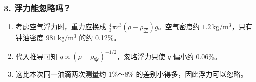 \subsubsection*{3. 浮力能忽略吗？}

\begin{enumerate}[leftmargin=3.6em]
\item 考虑空气浮力时，重力应换成 $\frac43\pi r^3(\rho-\rho_{\text{空}})g$。空气密度约 $1.2\,\mathrm{kg/m^3}$，只有钟油密度 $981\,\mathrm{kg/m^3}$ 的约 0.12\%。
\item 代入推导可知 $q\propto(\rho-\rho_{\text{空}})^{-1/2}$，忽略浮力只使 $q$ 偏小约 0.06\%。
\item 这比本次同一油滴两次测量约 1\%～8\% 的差别小得多，因此浮力可以忽略。
\end{enumerate}
